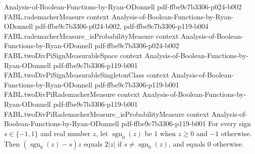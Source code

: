 \begin{theorem}
  {Analysis-of-Boolean-Functions-by-Ryan-ODonnell}
  {pdf-ffbe9c7b3306-p024-b002}
\proofstep
  {FABL.rademacherMeasure}
  {context}
  {Analysis-of-Boolean-Functions-by-Ryan-ODonnell}
  {pdf-ffbe9c7b3306-p024-b002,
    pdf-ffbe9c7b3306-p119-b004}
\proofstep
  {FABL.rademacherMeasure_isProbabilityMeasure}
  {context}
  {Analysis-of-Boolean-Functions-by-Ryan-ODonnell}
  {pdf-ffbe9c7b3306-p024-b002}
\proofstep
  {FABL.twoDivPiSignMeasurableSpace}
  {context}
  {Analysis-of-Boolean-Functions-by-Ryan-ODonnell}
  {pdf-ffbe9c7b3306-p119-b001}
\proofstep
  {FABL.twoDivPiSignMeasurableSingletonClass}
  {context}
  {Analysis-of-Boolean-Functions-by-Ryan-ODonnell}
  {pdf-ffbe9c7b3306-p119-b001}
\proofstep
  {FABL.twoDivPiRademacherMeasure}
  {context}
  {Analysis-of-Boolean-Functions-by-Ryan-ODonnell}
  {pdf-ffbe9c7b3306-p119-b001}
\proofstep
  {FABL.twoDivPiRademacherMeasure_isProbabilityMeasure}
  {context}
  {Analysis-of-Boolean-Functions-by-Ryan-ODonnell}
  {pdf-ffbe9c7b3306-p119-b001}
For every sign $s\in\{-1,1\}$ and real number $z$, let $\operatorname{sgn}_0(z)$ be
$1$ when $z\ge0$ and $-1$ otherwise. Then $(\operatorname{sgn}_0(z)-s)z$ equals $2|z|$
if $s\ne\operatorname{sgn}_0(z)$, and equals $0$ otherwise.
\end{theorem}

